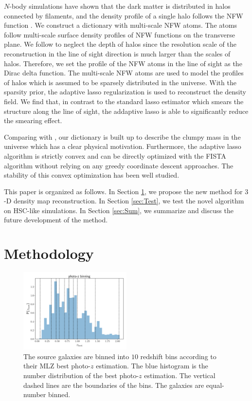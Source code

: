 \documentclass[twocolumn]{aastex62}
\begin{document}
$N$-body simulations have shown that the dark matter is distributed in halos connected by filaments, and the density
profile of a single halo follows the NFW function \citep{halo-NFW1997ApJ}.
We construct a dictionary with multi-scale NFW atoms.  The atoms follow multi-scale surface density profiles of NFW
functions \citep{haloModel-TJ2003-3pt} on the transverse plane. We follow \citet{LSS-massMap-Glimpse3D-Leonard2014}
to neglect the depth of halos since the resolution scale of the reconstruction in the line of sight direction is much
larger than the scales of halos. Therefore, we set the profile of the NFW atoms in the line of sight as the Dirac delta
function. The multi-scale NFW atoms are used to model the profiles of halos which is assumed to be sparsely distributed
in the universe. With the sparsity prior, the adaptive lasso regularization \citep{AdaLASSO-Zou2006} is used to reconstruct
the density field. We find that, in contrast to the standard lasso estimator which smears the structure along the line of sight,
the addaptive lasso is able to significantly reduce the smearing effect.

Comparing with \citet{LSS-massMap-Glimpse3D-Leonard2014}, our dictionary is built up to describe the clumpy mass
in the universe which has a clear physical motivation. Furthermore, the adaptive lasso algorithm is strictly convex and
can be directly optimized with the FISTA algorithm \citep{FISTA-Beck2009} without relying on any greedy coordinate
descent approaches.  The stability of this convex optimization has been well studied.

This paper is organized as follows.
In Section \ref{sec:Method}, we propose the new method for $3$-D density map reconstruction.
In Section \ref{sec:Test}, we test the novel algorithm on HSC-like simulations.
In Section \ref{sec:Sum}, we summarize and discuss the future development of the method.

\section{Methodology}
\label{sec:Method}

\begin{figure}[!t]
 \centering
 \includegraphics[width=0.5\textwidth]{photo-z_binning.pdf}
 \caption{The source galaxies are binned into $10$ redshift bins according to their MLZ best photo-$z$ estimation.
        The blue histogram is the number distribution of the best photo-$z$ estimation. The vertical dashed lines
        are the boundaries of the bins. The galaxies are equal-number binned.} \label{fig-bestpz}
\end{figure}
\end{document}
